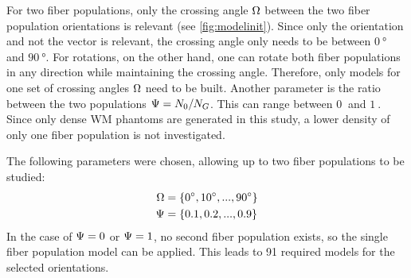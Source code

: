 For two fiber populations, only the crossing angle $\textnormal{$\Omega$}$ between the two fiber population orientations is relevant (see \cref{fig:modelinit}).
Since only the orientation and not the vector is relevant, the crossing angle only needs to be between $\SI{0}{\degree}$ and $\SI{90}{\degree}$.
For rotations, on the other hand, one can rotate both fiber populations in any direction while maintaining the crossing angle.
Therefore, only models for one set of crossing angles $\textnormal{$\Omega$}$ need to be built.
Another parameter is the ratio between the two populations $\textnormal{$\Psi$}=N_0/N_G$.
This can range between $\SI{0}{}$ and $\SI{1}{}$.
Since only dense \ac{WM} phantoms are generated in this study, a lower density of only one fiber population is not investigated.
\par
%
The following parameters were chosen, allowing up to two fiber populations to be studied:
\begin{align}
    \begin{split}
        \textnormal{$\Omega$} &= \{\SI{0}{\degree}, \SI{10}{\degree}, ..., \SI{90}{\degree}\}\\
        \textnormal{$\Psi$} &= \{\SI{0.1}{}, \SI{0.2}{}, ..., \SI{0.9}{}\}
    \end{split}
\end{align}
In the case of $\textnormal{$\Psi$} = 0$ or $\textnormal{$\Psi$} = 1$, no second fiber population exists, so the single fiber population model can be applied.
This leads to 91 required models for the selected orientations.
%
% 
% 
